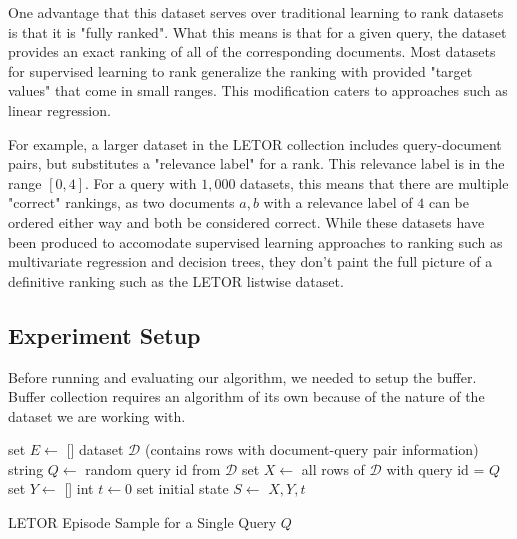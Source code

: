 \documentclass{article}
\begin{document}
One advantage that this dataset serves over traditional learning to rank datasets is that it is "fully ranked". What this means is that for a given query, the dataset provides an exact ranking of all of the corresponding documents.  Most datasets for supervised learning to rank generalize the ranking with provided "target values" that come in small ranges. This modification caters to approaches such as linear regression.

For example, a larger dataset in the LETOR collection includes query-document pairs, but substitutes a "relevance label" for a rank. This relevance label is in the range $[0,4]$. For a query with $1,000$ datasets, this means that there are multiple "correct" rankings, as two documents $a,b$ with a relevance label of $4$ can be ordered either way and both be considered correct. While these datasets have been produced to accomodate supervised learning approaches to ranking such as multivariate regression and decision trees, they don't paint the full picture of a definitive ranking such as the LETOR listwise dataset.

\subsection{Experiment Setup}
Before running and evaluating our algorithm, we needed to setup the buffer. Buffer collection requires an algorithm of its own because of the nature of the dataset we are working with. 

\begin{algorithm}[H]
\SetAlgoLined
{}
 set $E\leftarrow$ []\;
 dataset $\mathcal{D}$ (contains rows with document-query pair information)\;
 string $Q\leftarrow$ random query id from $\mathcal{D}$\;
 set $X\leftarrow$ all rows of $\mathcal{D}$ with query id = $Q$\;
 set $Y\leftarrow$ []\;
 int $t\leftarrow 0$\;
 set initial state $S \leftarrow$ $X, Y, t$\;
 \caption{LETOR Episode Sample for a Single Query $Q$}
\end{algorithm}
\end{document}
